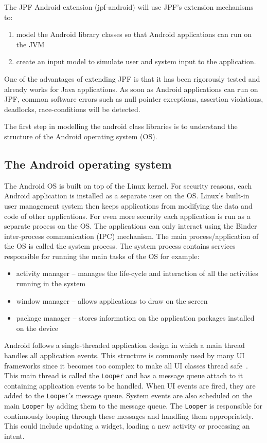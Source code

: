\documentclass{sig-alternate}
\begin{document}
The JPF Android extension (jpf-android) will use JPF's extension mechanisms to:
\begin{enumerate}
\item model the Android library classes so that Android applications can run on the JVM
\item create an input model to simulate user and system input to the application.
\end{enumerate}

One of the advantages of extending JPF is that it has been rigorously tested and already works for Java applications. As soon as
Android applications can run on JPF, common software errors such as null pointer exceptions, assertion violations, deadlocks,
race-conditions will be detected.

The first step in modelling the android class libraries is to understand the structure of the Android operating system (OS).

\subsection{The Android operating system}

The Android OS is built on top of the Linux kernel. For security reasons, each Android application is installed as a separate user
on the OS. Linux's built-in user management system then keeps applications from modifying the data and code of other applications. For
even more security each application is run as a separate process on the OS. The applications can only interact using the Binder
inter-process communication (IPC) mechanism. The main process/application of the OS is called the system process. The system process
contains services responsible for running the main tasks of the OS for example:
\begin{itemize}
 \item activity manager -- manages the life-cycle and interaction of all the activities running in the system
 \item window manager -- allows applications to draw on the screen
 \item package manager -- stores information on the application packages installed on the device
\end{itemize}

Android follows a single-threaded application design in which a main thread handles all application events. This structure is
commonly used by many UI frameworks since it becomes too complex to make all UI classes thread safe~\cite{}. This main thread is called
the \texttt{Looper} and has a message queue attach to it containing application events to be handled. When UI events are fired, they
are added to the \texttt{Looper}'s message queue. System events are also scheduled on the main \texttt{Looper} by adding them to the message
queue. The \texttt{Looper} is responsible for continuously looping through these messages and handling them appropriately. This could
include updating a widget, loading a new activity or processing an intent.
\end{document}

